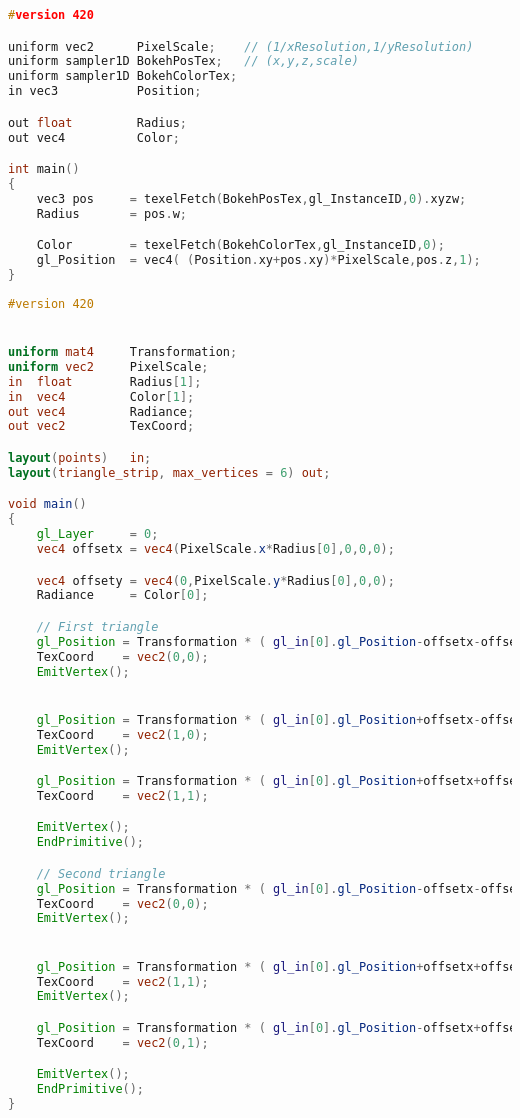 \begin{lstlisting}[language=C++,float={htb},caption={Vertex shader for rendering bokeh.},label={YourName:listing1}]
#version 420

uniform vec2      PixelScale;    // (1/xResolution,1/yResolution)
uniform sampler1D BokehPosTex;   // (x,y,z,scale)
uniform sampler1D BokehColorTex;
in vec3           Position;

out float         Radius;
out vec4          Color;

int main()
{
	vec3 pos     = texelFetch(BokehPosTex,gl_InstanceID,0).xyzw;
	Radius       = pos.w;

	Color        = texelFetch(BokehColorTex,gl_InstanceID,0);
	gl_Position	 = vec4( (Position.xy+pos.xy)*PixelScale,pos.z,1);
}
\end{lstlisting}

\begin{lstlisting}[language=GLSL,float={htb},caption={Geometry shader for rendering bokeh.},label={YourName:listing1}]
#version 420


uniform mat4     Transformation;
uniform vec2     PixelScale;
in  float        Radius[1];
in  vec4         Color[1];
out vec4         Radiance;
out vec2         TexCoord;

layout(points)   in;
layout(triangle_strip, max_vertices = 6) out;

void main()
{
	gl_Layer     = 0;
	vec4 offsetx = vec4(PixelScale.x*Radius[0],0,0,0);

	vec4 offsety = vec4(0,PixelScale.y*Radius[0],0,0);
	Radiance     = Color[0];

	// First triangle
	gl_Position = Transformation * ( gl_in[0].gl_Position-offsetx-offsety);
	TexCoord    = vec2(0,0);
	EmitVertex();


	gl_Position = Transformation * ( gl_in[0].gl_Position+offsetx-offsety);
	TexCoord    = vec2(1,0);
	EmitVertex();

	gl_Position = Transformation * ( gl_in[0].gl_Position+offsetx+offsety);
	TexCoord    = vec2(1,1);

	EmitVertex();
	EndPrimitive();

	// Second triangle
	gl_Position = Transformation * ( gl_in[0].gl_Position-offsetx-offsety);
	TexCoord    = vec2(0,0);
	EmitVertex();


	gl_Position = Transformation * ( gl_in[0].gl_Position+offsetx+offsety);
	TexCoord    = vec2(1,1);
	EmitVertex();

	gl_Position = Transformation * ( gl_in[0].gl_Position-offsetx+offsety);
	TexCoord    = vec2(0,1);

	EmitVertex();
	EndPrimitive();
}
\end{lstlisting}

